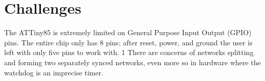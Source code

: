 \section{Challenges}

The ATTiny85 is extremely limited on General Purpose Input Output (GPIO) pins. The entire chip only has 8 pins; after reset, power, and ground the user is left with only five pins to work with. 1
There are concerns of networks splitting and forming two separately synced networks, even more so in hardware where the watchdog is an imprecise timer. 

